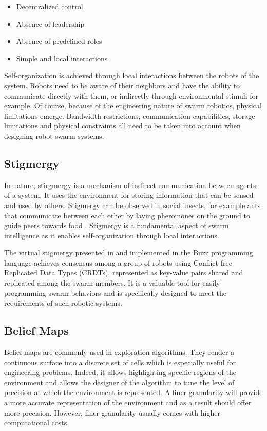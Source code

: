 \begin{itemize}
    \item Decentralized control
    \item Absence of leadership
    \item Absence of predefined roles
    \item Simple and local interactions
\end{itemize}

Self-organization is achieved through local interactions between the robots of the system. Robots need to be aware of their neighbors and have the ability to communicate directly with them, or indirectly through environmental stimuli for example. Of course, because of the engineering nature of swarm robotics, physical limitations emerge. Bandwidth restrictions, communication capabilities, storage limitations and physical constraints all need to be taken into account when designing robot swarm systems.

\subsection{Stigmergy}
In nature, stirgmergy is a mechanism of indirect communication between agents of a system. It uses the environment for storing information that can be sensed and used by others. Stigmergy can be observed in social insects, for example ants that communicate between each other by laying pheromones on the ground to guide peers towards food \cite{bonabeau1999swarm}. Stigmergy is a fundamental aspect of swarm intelligence as it enables self-organization through local interactions.

The virtual stigmergy presented in \cite{pinciroliTuple2016} and implemented in the Buzz programming language \cite{pinciroliBuzz2016} achieves consensus among
a group of robots using Conflict-free Replicated Data Types (CRDTs), represented as key-value pairs shared and replicated among the swarm members.  It is a valuable tool for easily programming swarm behaviors and is specifically designed to meet the requirements of such robotic systems. 

\subsection{Belief Maps}
Belief maps are commonly used in exploration algorithms. They render a continuous surface into a discrete set of cells which is especially useful for engineering problems. Indeed, it allows highlighting specific regions of the environment and allows the designer of the algorithm to tune the level of precision at which the environment is represented. A finer granularity will provide a more accurate representation of the environment and as a result should offer more precision. However, finer granularity usually comes with higher computational costs. 

